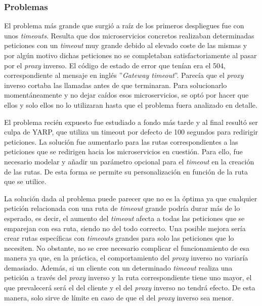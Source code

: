 \documentclass[11pt,spanish,listoffigures]{tfgetsinf}
\begin{document}

			\subsubsection{Problemas}

El problema más grande que surgió a raíz de los primeros despliegues fue con unos \emph{timeouts}. Resulta que dos microservicios concretos realizaban determinadas peticiones con un \emph{timeout} muy grande debido al elevado coste de las mismas y por algún motivo dichas peticiones no se completaban satisfactoriamente al pasar por el \emph{proxy} inverso. El código de estado de error que tenían era el 504, correspondiente al mensaje en inglés ''\emph{Gateway timeout}''. Parecía que el \emph{proxy} inverso cortaba las llamadas antes de que terminaran. Para solucionarlo momentáneamente y no dejar caídos esos microservicios, se optó por hacer que ellos y solo ellos no lo utilizaran hasta que el problema fuera analizado en detalle.

El problema recién expuesto fue estudiado a fondo más tarde y al final resultó ser culpa de YARP, que utiliza un timeout por defecto de 100 segundos para redirigir peticiones. La solución fue aumentarlo para las rutas correspondientes a las peticiones que se redirigen hacia los microservicios en cuestión. Para ello, fue necesario modelar y añadir un parámetro opcional para el \emph{timeout} en la creación de las rutas. De esta forma se permite su personalización en función de la ruta que se utilice.

La solución dada al problema puede parecer que no es la óptima ya que cualquier petición relacionada con una ruta de \emph{timeout} grande podría durar más de lo esperado, es decir, el aumento del \emph{timeout} afecta a todas las peticiones que se emparejan con esa ruta, siendo no del todo correcto. Una posible mejora sería crear rutas específicas con \emph{timeouts} grandes para solo las peticiones que lo necesiten. No obstante, no se cree necesario complicar el funcionamiento de esa manera ya que, en la práctica, el comportamiento del \emph{proxy} inverso no variaría demasiado. Además, si un cliente con un determinado \emph{timeout} realiza una petición a través del \emph{proxy} inverso y la ruta correspondiente tiene uno mayor, el que prevalecerá será el del cliente y el del \emph{proxy} inverso no tendrá efecto. De esta manera, solo sirve de límite en caso de que el del \emph{proxy} inverso sea menor.
\end{document}
